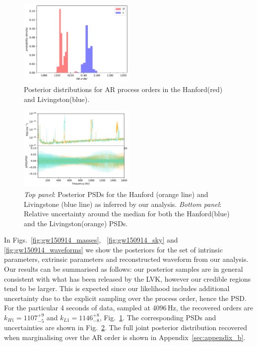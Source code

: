 \documentclass{aa}
\begin{document}
\begin{figure}
	\caption{Posterior distributions for AR process orders in the Hanford(red) and Livingston(blue).}
	\label{fig:gw150914_orders}
	\includegraphics[width=0.5\textwidth,keepaspectratio]{Images/gw150914/orders.pdf}
\end{figure}

\begin{figure}
	\caption{\emph{Top panel}: Posterior PSDs for the Hanford (orange line) and Livingstone (blue line) as inferred by our analysis. \emph{Bottom panel}: Relative uncertainty around the median for both the Hanford(blue) and the Livingston(orange) PSDs.}
	\label{fig:gw150914_psds}
	\includegraphics[width=0.5\textwidth,keepaspectratio]{Images/gw150914/posterior_psds.pdf}
\end{figure}

In Figs.~\ref{fig:gw150914_masses}, ~\ref{fig:gw150914_sky} and \ref{fig:gw150914_waveforms} we show the posteriors for the set of intrinsic parameters, extrinsic parameters and reconstructed waveform from our analysis. Our results can be summarised as follows: our posterior samples are in general consistent with what has been released by the LVK, however our credible regions tend to be larger. This is expected since our likelihood includes additional uncertainty due to the explicit sampling over the process order, hence the PSD. For the particular 4 seconds of data, sampled at 4096\,Hz, the recovered orders are $k_{H1} = 1107_{-5}^{+9}$ and $k_{L1} = 1146_{-8}^{+8}$, Fig.~\ref{fig:gw150914_orders}. The corresponding PSDs and uncertainties are shown in Fig.~\ref{fig:gw150914_psds}. The full joint posterior distribution recovered when marginalising over the AR order is shown in Appendix~\ref{sec:appendix_b}.
\end{document}
